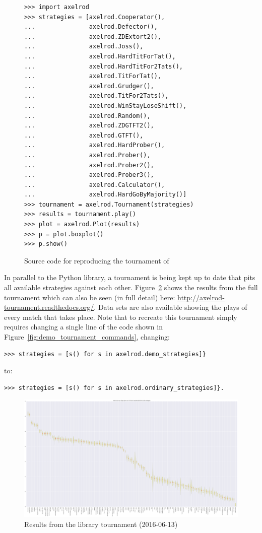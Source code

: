 \documentclass{jors}
\begin{document}
\begin{figure}[!hbtp]
    \begin{verbatim}
>>> import axelrod
>>> strategies = [axelrod.Cooperator(),
...               axelrod.Defector(),
...               axelrod.ZDExtort2(),
...               axelrod.Joss(),
...               axelrod.HardTitForTat(),
...               axelrod.HardTitFor2Tats(),
...               axelrod.TitForTat(),
...               axelrod.Grudger(),
...               axelrod.TitFor2Tats(),
...               axelrod.WinStayLoseShift(),
...               axelrod.Random(),
...               axelrod.ZDGTFT2(),
...               axelrod.GTFT(),
...               axelrod.HardProber(),
...               axelrod.Prober(),
...               axelrod.Prober2(),
...               axelrod.Prober3(),
...               axelrod.Calculator(),
...               axelrod.HardGoByMajority()]
>>> tournament = axelrod.Tournament(strategies)
>>> results = tournament.play()
>>> plot = axelrod.Plot(results)
>>> p = plot.boxplot()
>>> p.show()
    \end{verbatim}
    \caption{Source code for reproducing the tournament of \cite{Stewart2012}}
    \label{fig:stewart-code}
\end{figure}

In parallel to the Python library, a tournament is being kept up to date that
pits all available strategies against each other. Figure~\ref{fig:tournament}
shows the results from the full tournament which can also be seen (in full
detail) here: \url{http://axelrod-tournament.readthedocs.org/}. Data sets are
also available showing the plays of every match that takes place. Note that to
recreate this tournament simply requires changing a single line of the code
shown in Figure~\ref{fig:demo_tournament_commands}, changing:

\begin{verbatim}
>>> strategies = [s() for s in axelrod.demo_strategies]}
\end{verbatim}

to:

\begin{verbatim}
>>> strategies = [s() for s in axelrod.ordinary_strategies]}.
\end{verbatim}

\begin{figure}[!hbtp]
    \centering
    \includegraphics[width=.75\textwidth]{tournament.pdf}
    \caption{Results from the library tournament (2016-06-13)}
    \label{fig:tournament}
\end{figure}
\end{document}
